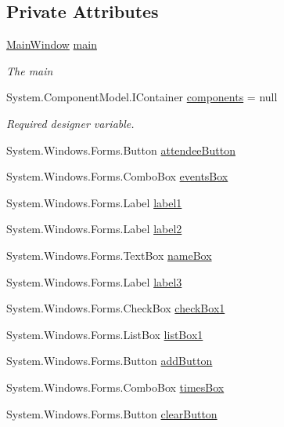 \subsection*{Private Attributes}
\begin{DoxyCompactItemize}
\item 
\hyperlink{classProject1_1_1MainWindow}{Main\+Window} \hyperlink{classProject1_1_1AvailabilityForm_a419ed9676deb632263bb8c6c74e018e0}{main}
\begin{DoxyCompactList}\small\item\em The main \end{DoxyCompactList}\item 
System.\+Component\+Model.\+I\+Container \hyperlink{classProject1_1_1AvailabilityForm_a929fcebbd2314eb26d638c445aba4d7f}{components} = null
\begin{DoxyCompactList}\small\item\em Required designer variable. \end{DoxyCompactList}\item 
System.\+Windows.\+Forms.\+Button \hyperlink{classProject1_1_1AvailabilityForm_a22eb22776a89cf96b9082108d98b590b}{attendee\+Button}
\item 
System.\+Windows.\+Forms.\+Combo\+Box \hyperlink{classProject1_1_1AvailabilityForm_a57dbb49a194b4b5c1fa4d3efab2eeb1c}{events\+Box}
\item 
System.\+Windows.\+Forms.\+Label \hyperlink{classProject1_1_1AvailabilityForm_aa64d6a18cee83f2e0fcc2190814bc343}{label1}
\item 
System.\+Windows.\+Forms.\+Label \hyperlink{classProject1_1_1AvailabilityForm_ac6fe189a297a1d04f4534257c02a7935}{label2}
\item 
System.\+Windows.\+Forms.\+Text\+Box \hyperlink{classProject1_1_1AvailabilityForm_a039d2e571e7240411359ea4687f45286}{name\+Box}
\item 
System.\+Windows.\+Forms.\+Label \hyperlink{classProject1_1_1AvailabilityForm_a0400b09173c591503c6829ee0eaf6f7e}{label3}
\item 
System.\+Windows.\+Forms.\+Check\+Box \hyperlink{classProject1_1_1AvailabilityForm_ad9cb659cfcfad769b22438a66b0d2536}{check\+Box1}
\item 
System.\+Windows.\+Forms.\+List\+Box \hyperlink{classProject1_1_1AvailabilityForm_ab81f223485ff3facaaf21ed7471d236c}{list\+Box1}
\item 
System.\+Windows.\+Forms.\+Button \hyperlink{classProject1_1_1AvailabilityForm_a636f4b3dee36ddf9496284f2880f3295}{add\+Button}
\item 
System.\+Windows.\+Forms.\+Combo\+Box \hyperlink{classProject1_1_1AvailabilityForm_ade05a84a3b2f475e58385e13f2a35f38}{times\+Box}
\item 
System.\+Windows.\+Forms.\+Button \hyperlink{classProject1_1_1AvailabilityForm_addb714f21b742224d959b2e7ff167583}{clear\+Button}
\end{DoxyCompactItemize}


